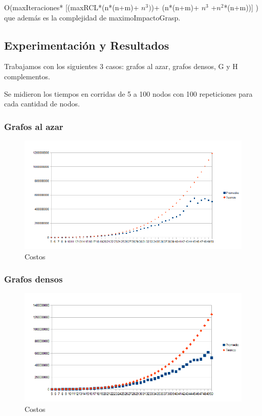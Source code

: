O(maxIteraciones* [(maxRCL*(n*(n+m)+ $n^{3})$)+ (n*(n+m)+ $n^{3}$ +$ n^{2}$*(n+m))] )\\

 que además es la complejidad de maximoImpactoGrasp.\\


\subsection{Experimentación y Resultados}
\quad Trabajamos con los siguientes 3 casos: grafos al azar, grafos densos, G y H complementos.

\quad Se midieron los tiempos en corridas de  5 a 100 nodos con 100 repeticiones para cada cantidad de nodos.

\subsubsection{Grafos al azar}

\begin{figure}[H]
	\centering
	\includegraphics[scale=0.8]{grasp-tiempos-Azar.png}
\caption{Costos}
\end{figure}

\subsubsection{Grafos densos}

\begin{figure}[H]
	\centering
	\includegraphics[scale=0.8]{grasp-tiempos-G-y-H-densos.png}
\caption{Costos}
\end{figure}


